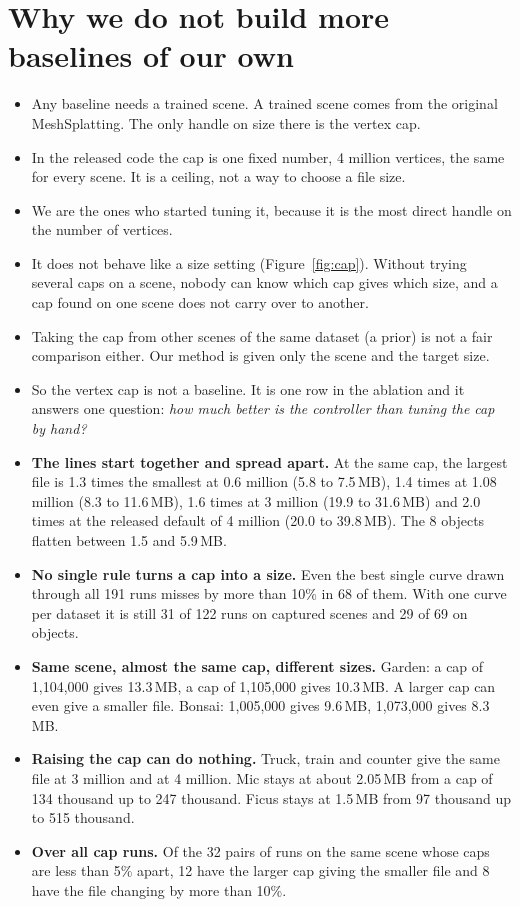 \documentclass[10pt]{article}
\begin{document}
\section{Why we do not build more baselines of our own}
\begin{itemize}
\item Any baseline needs a trained scene. A trained scene comes from the original MeshSplatting. The only handle on size there is the vertex cap.
\item In the released code the cap is one fixed number, 4 million vertices, the same for every scene. It is a ceiling, not a way to choose a file size.
\item We are the ones who started tuning it, because it is the most direct handle on the number of vertices.
\item It does not behave like a size setting (Figure~\ref{fig:cap}). Without trying several caps on a scene, nobody can know which cap gives which size, and a cap found on one scene does not carry over to another.
\item Taking the cap from other scenes of the same dataset (a prior) is not a fair comparison either. Our method is given only the scene and the target size.
\item So the vertex cap is not a baseline. It is one row in the ablation and it answers one question: \emph{how much better is the controller than tuning the cap by hand?}
\end{itemize}


\begin{itemize}
\item \textbf{The lines start together and spread apart.} At the same cap, the largest file is 1.3 times the smallest at 0.6 million (5.8 to 7.5\,MB), 1.4 times at 1.08 million (8.3 to 11.6\,MB), 1.6 times at 3 million (19.9 to 31.6\,MB) and 2.0 times at the released default of 4 million (20.0 to 39.8\,MB). The 8 objects flatten between 1.5 and 5.9\,MB.
\item \textbf{No single rule turns a cap into a size.} Even the best single curve drawn through all 191 runs misses by more than 10\% in 68 of them. With one curve per dataset it is still 31 of 122 runs on captured scenes and 29 of 69 on objects.
\item \textbf{Same scene, almost the same cap, different sizes.} Garden: a cap of 1,104,000 gives 13.3\,MB, a cap of 1,105,000 gives 10.3\,MB. A larger cap can even give a smaller file. Bonsai: 1,005,000 gives 9.6\,MB, 1,073,000 gives 8.3\,MB.
\item \textbf{Raising the cap can do nothing.} Truck, train and counter give the same file at 3 million and at 4 million. Mic stays at about 2.05\,MB from a cap of 134 thousand up to 247 thousand. Ficus stays at 1.5\,MB from 97 thousand up to 515 thousand.
\item \textbf{Over all cap runs.} Of the 32 pairs of runs on the same scene whose caps are less than 5\% apart, 12 have the larger cap giving the smaller file and 8 have the file changing by more than 10\%.
\end{itemize}
\end{document}
